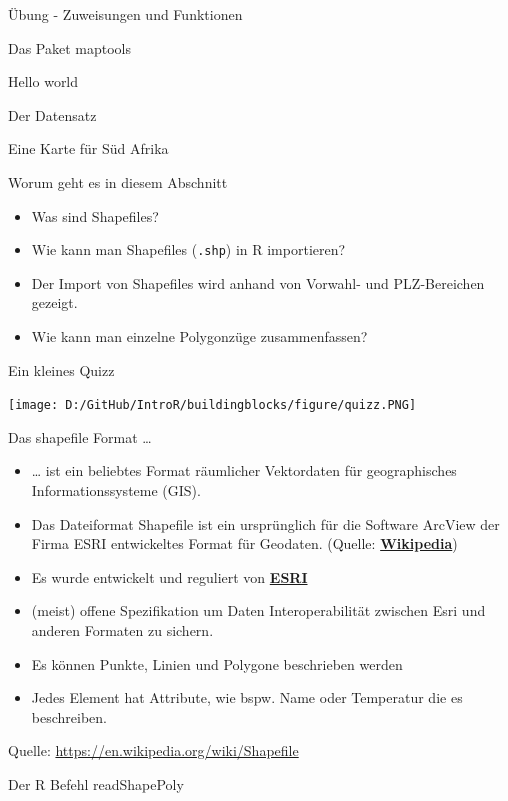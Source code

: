 \documentclass[ignorenonframetext,]{beamer}
\providecommand{\tightlist}{%
  \setlength{\itemsep}{0pt}\setlength{\parskip}{0pt}}
\begin{document}
\begin{frame}[fragile]{Übung - Zuweisungen und Funktionen}
\begin{frame}[fragile]{Das Paket maptools}
\begin{frame}[fragile]{Hello world}
\begin{frame}[fragile]{Der Datensatz}
\begin{frame}[fragile]{Eine Karte für Süd Afrika}
\begin{frame}[fragile]{Worum geht es in diesem Abschnitt}
\begin{itemize}
\tightlist
\item
  Was sind Shapefiles?
\item
  Wie kann man Shapefiles (\texttt{.shp}) in R importieren?
\item
  Der Import von Shapefiles wird anhand von Vorwahl- und PLZ-Bereichen
  gezeigt.
\item
  Wie kann man einzelne Polygonzüge zusammenfassen?
\end{itemize}

\end{frame}

\begin{frame}{Ein kleines Quizz}
\protect\hypertarget{ein-kleines-quizz}{}

\texttt{[image: D:/GitHub/IntroR/buildingblocks/figure/quizz.PNG]}

\end{frame}

\begin{frame}{Das shapefile Format \ldots{}}
\protect\hypertarget{das-shapefile-format}{}

\begin{itemize}
\item
  \ldots{} ist ein beliebtes Format räumlicher Vektordaten für
  geographisches Informationssysteme (GIS).
\item
  Das Dateiformat Shapefile ist ein ursprünglich für die Software
  ArcView der Firma ESRI entwickeltes Format für Geodaten. (Quelle:
  \href{https://de.wikipedia.org/wiki/Shapefile}{\textbf{Wikipedia}})
\item
  Es wurde entwickelt und reguliert von
  \href{http://www.esri.com/}{\textbf{ESRI}}
\item
  (meist) offene Spezifikation um Daten Interoperabilität zwischen Esri
  und anderen Formaten zu sichern.
\item
  Es können Punkte, Linien und Polygone beschrieben werden
\item
  Jedes Element hat Attribute, wie bspw. Name oder Temperatur die es
  beschreiben.
\end{itemize}

Quelle: \url{https://en.wikipedia.org/wiki/Shapefile}

\end{frame}

\begin{frame}{Der R Befehl readShapePoly}
\protect\hypertarget{der-r-befehl-readshapepoly}{}


\end{frame}
\end{frame}
\end{frame}
\end{frame}
\end{frame}
\end{frame}
\end{document}
